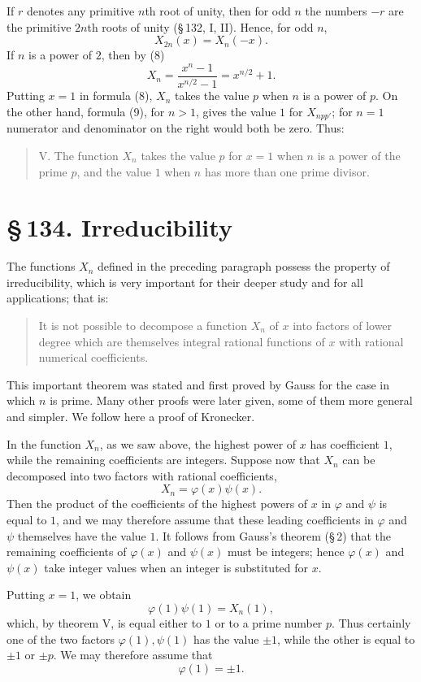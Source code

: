 \documentclass[11pt]{article}
\providecommand{\sect}[2]{\section*{\S\,#1. #2}}
\begin{document}
If $r$ denotes any primitive $n$th root of unity, then for odd $n$ the numbers $-r$ are the primitive $2n$th roots of unity (\S\,132, I, II). Hence, for odd $n$,
\[
\tag{11}       X_{2n}(x)=X_n(-x).
\]
If $n$ is a power of $2$, then by (8)
\[
\tag{12}       X_n=\frac{x^n-1}{x^{n/2}-1}=x^{n/2}+1.
\]
Putting $x=1$ in formula (8), $X_n$ takes the value $p$ when $n$ is a power of $p$. On the other hand, formula (9), for $n>1$, gives the value $1$ for $X_{npp'}$; for $n=1$ numerator and denominator on the right would both be zero. Thus:
\begin{quote}
V. The function $X_n$ takes the value $p$ for $x=1$ when $n$ is a power of the prime $p$, and the value $1$ when $n$ has more than one prime divisor.
\end{quote}

\sect{134}{Irreducibility}

The functions $X_n$ defined in the preceding paragraph possess the property of irreducibility, which is very important for their deeper study and for all applications; that is:
\begin{quote}
It is not possible to decompose a function $X_n$ of $x$ into factors of lower degree which are themselves integral rational functions of $x$ with rational numerical coefficients.
\end{quote}
This important theorem was stated and first proved by Gauss for the case in which $n$ is prime. Many other proofs were later given, some of them more general and simpler. We follow here a proof of Kronecker.

In the function $X_n$, as we saw above, the highest power of $x$ has coefficient $1$, while the remaining coefficients are integers. Suppose now that $X_n$ can be decomposed into two factors with rational coefficients,
\[
\tag{1}        X_n=\varphi(x)\psi(x).
\]
Then the product of the coefficients of the highest powers of $x$ in $\varphi$ and $\psi$ is equal to $1$, and we may therefore assume that these leading coefficients in $\varphi$ and $\psi$ themselves have the value $1$. It follows from Gauss's theorem (\S\,2) that the remaining coefficients of $\varphi(x)$ and $\psi(x)$ must be integers; hence $\varphi(x)$ and $\psi(x)$ take integer values when an integer is substituted for $x$.

Putting $x=1$, we obtain
\[
        \varphi(1)\psi(1)=X_n(1),
\]
which, by theorem V, is equal either to $1$ or to a prime number $p$. Thus certainly one of the two factors $\varphi(1),\psi(1)$ has the value $\pm1$, while the other is equal to $\pm1$ or $\pm p$. We may therefore assume that
\[
\tag{2}        \varphi(1)=\pm1.
\]
\end{document}
